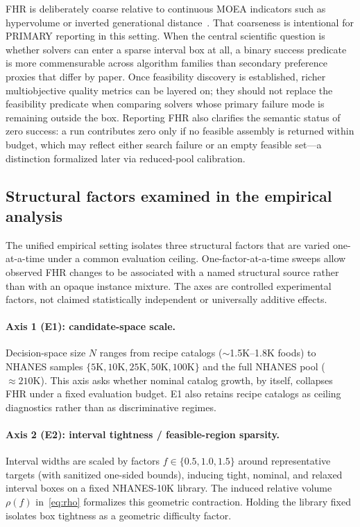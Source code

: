 \documentclass[lettersize,journal]{IEEEtran}
\begin{document}
FHR is deliberately coarse relative to continuous MOEA indicators such as hypervolume or inverted generational distance~\cite{zitzler2001}.
That coarseness is intentional for PRIMARY reporting in this setting.
When the central scientific question is whether solvers can enter a sparse interval box at all, a binary success predicate is more commensurable across algorithm families than secondary preference proxies that differ by paper.
Once feasibility discovery is established, richer multiobjective quality metrics can be layered on; they should not replace the feasibility predicate when comparing solvers whose primary failure mode is remaining outside the box.
Reporting FHR also clarifies the semantic status of zero success: a run contributes zero only if no feasible assembly is returned within budget, which may reflect either search failure or an empty feasible set---a distinction formalized later via reduced-pool calibration.

\subsection{Structural factors examined in the empirical analysis}
The unified empirical setting isolates three structural factors that are varied one-at-a-time under a common evaluation ceiling.
One-factor-at-a-time sweeps allow observed FHR changes to be associated with a named structural source rather than with an opaque instance mixture.
The axes are controlled experimental factors, not claimed statistically independent or universally additive effects.

\paragraph{Axis 1 (E1): candidate-space scale.}
Decision-space size $N$ ranges from recipe catalogs ($\sim$1.5K--1.8K foods) to NHANES samples $\{5\mathrm{K},10\mathrm{K},25\mathrm{K},50\mathrm{K},100\mathrm{K}\}$ and the full NHANES pool ($\approx 210\mathrm{K}$).
This axis asks whether nominal catalog growth, by itself, collapses FHR under a fixed evaluation budget.
E1 also retains recipe catalogs as ceiling diagnostics rather than as discriminative regimes.

\paragraph{Axis 2 (E2): interval tightness / feasible-region sparsity.}
Interval widths are scaled by factors $f\in\{0.5,1.0,1.5\}$ around representative targets (with sanitized one-sided bounds), inducing tight, nominal, and relaxed interval boxes on a fixed NHANES-10K library.
The induced relative volume $\rho(f)$ in~\eqref{eq:rho} formalizes this geometric contraction.
Holding the library fixed isolates box tightness as a geometric difficulty factor.
\end{document}
